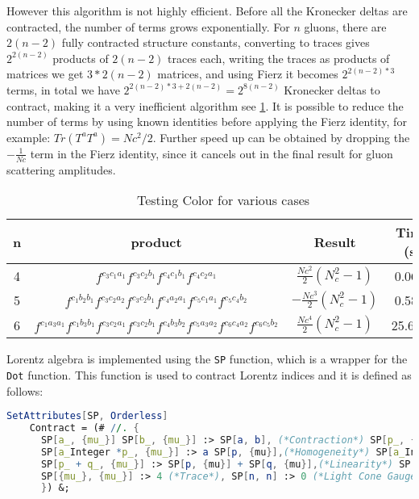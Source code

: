 \documentclass[main.tex]{subfiles}
\begin{document}
\begin{itemize}
    However this algorithm is not highly efficient. Before all the Kronecker deltas are contracted, the number of terms grows exponentially.
    For $n$ gluons, there are $2(n-2)$ fully contracted structure constants, converting to traces gives $2^{2(n-2)}$ products of $2(n-2)$ traces each, writing
    the traces as products of matrices we get $3*2(n-2)$ matrices, and using Fierz it becomes $2^{2(n-2)*3}$ terms, in total 
    we have $2^{2(n-2)*3+2(n-2)}= 2^{8(n-2)}$ Kronecker deltas to contract, making it a very inefficient algorithm see \cref{tab:color-algebra}. It is possible to reduce
    the number of terms by using known identities before applying the Fierz identity, for example: $ Tr(T^aT^a) = Nc^2/2$. Further speed up can be obtained by
    dropping the $-\frac{1}{Nc}$ term in the Fierz identity, since it cancels out in the final result for gluon scattering amplitudes.
\end{itemize}

\begin{table}
    \centering
    \caption{Testing Color for various cases}
    \label{tab:color-algebra}
    \begin{tabular}{|c|c|c|c|}
        \hline
        \textbf{n} & \textbf{product} & \textbf{Result} & \textbf{Time (s)} \\
        \hline
        4 & $f^{c_3 c_1 a_1} f^{c_3 c_2 b_1} f^{c_4 c_1 b_1} f^{c_4 c_2 a_1}$ &  $\frac{Nc^2}{2}(N_c^2 - 1)$ & 0.0625 \\
        5 & $f^{c_1 b_2 b_1} f^{c_3 c_2 a_2} f^{c_3 c_2 b_1}f^{c_4 a_2 a_1} f^{c_5 c_1 a_1} f^{c_5 c_4 b_2}$ & $-\frac{Nc^3}{2}(N_c^2 - 1)$ & 0.5868 \\
        6 & $f^{c_1 a_3 a_1} f^{c_1 b_3 b_1} f^{c_3 c_2 a_1}f^{c_3 c_2 b_1} f^{c_4 b_3 b_2}f^{c_5 a_3 a_2} f^{c_6 c_4 a_2} f^{c_6 c_5 b_2} $ & $\frac{Nc^4}{2}(N_c^2 - 1)$ & 25.6701 \\
        \hline
    \end{tabular}
\end{table}


Lorentz algebra is implemented using the \texttt{SP} function, which is a wrapper for the \texttt{Dot} function. This 
function is used to contract Lorentz indices and it is defined as follows:

\begin{lstlisting}[language=Mathematica,caption = {Lorentz algebra}, label = {lst:lorentz-algebra}]
    SetAttributes[SP, Orderless]
    Contract = (# //. {
      SP[a_, {mu_}] SP[b_, {mu_}] :> SP[a, b], (*Contraction*) SP[p_, {mu_}] SP[p_, {mu_}] :> SP[p, p],(*Square*)
      SP[a_Integer *p_, {mu_}] :> a SP[p, {mu}],(*Homogeneity*) SP[a_Integer *p_, q_] :> a SP[p, q], (*Homogeneity*)
      SP[p_ + q_, {mu_}] :> SP[p, {mu}] + SP[q, {mu}],(*Linearity*) SP[a_, b_ + c_] :> (SP[a, b] + SP[a, c]),(*Distributive property*)
      SP[{mu_}, {mu_}] :> 4 (*Trace*), SP[n, n] :> 0 (*Light Cone Gauge*), SP[p[i_], p[i_]] :> 0 (*On Shell Condition*)
      }) &;
\end{lstlisting}
\end{document}
